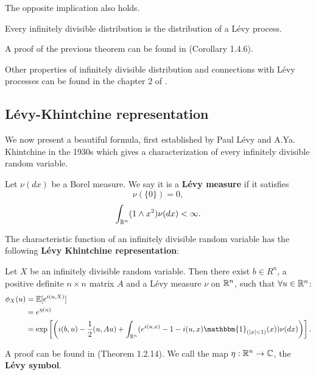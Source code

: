 The opposite implication also holds. 
\begin{Theorem}
Every infinitely divisible distribution is the distribution of a Lévy process. 
\end{Theorem}
A proof of the previous theorem can be found in \cite{Applebaum} (Corollary 1.4.6).

Other properties of infinitely divisible distribution and connections with Lévy processes can be found in the chapter 2 of \cite{Sato}.\\

\subsection{Lévy-Khintchine representation}

We now present a beautiful formula, first established by Paul Lévy and A.Ya. Khintchine in the 1930s
which gives a characterization of every infinitely divisible random variable.\\

\begin{Definition} \label{Levy_measure}
Let $\nu(dx)$ be a Borel measure. We say it is a \textbf{Lévy measure} if it satisfies
\begin{equation}
 \nu (\{ 0 \} ) = 0,
\end{equation}
\begin{equation} \label{Levy_m}
 \int_{\mathbb{R}^n} (1\wedge x^2) \nu(dx) < \infty.
\end{equation}
\end{Definition}
The characteristic function of an infinitely divisible random variable has the following \textbf{Lévy Khintchine representation}:
\begin{Theorem}
 Let $X$ be an infinitely divisible random variable. Then there exist $b\in R^n$, a positive definite $n\times n$ matrix $A$
 and a Lévy measure $\nu$ on $\mathbb{R}^n$, such that $\forall u \in \mathbb{R}^n$:
\begin{align}
\phi_X(u)  &= \mathbb{E} [e^{i(u,X)}]  \\ 
	   &= e^{\eta(u)} \nonumber \\
	   &= \exp \left[ \left( i(b,u) - \frac{1}{2}(u,Au) + \int_{\R^n} 
	   ( e^{i(u,x)} -1 -i(u,x) \mathbbm{1}_{(|x|<1)}(x) ) \nu(dx) \right) \right]. \nonumber		      
\end{align}
\end{Theorem}
A proof can be found in \cite{Applebaum} (Theorem 1.2.14).
We call the map $\eta : \mathbb{R}^n \to \mathbb{C}$, the \textbf{Lévy symbol}.

